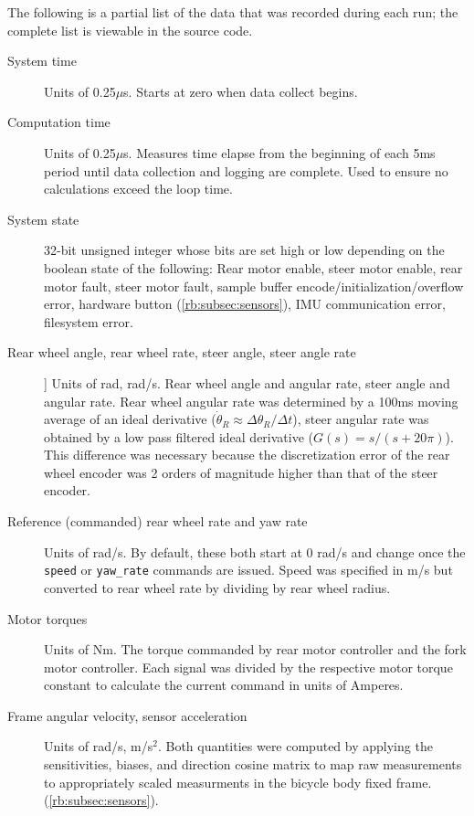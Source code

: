 The following is a partial list of the data that was recorded during each run;
the complete list is viewable in the source code.
\begin{description}
  \item[System time] Units of 0.25$\mu$s. Starts at zero when data collect
    begins.
  \item[Computation time] Units of 0.25$\mu$s. Measures time elapse from the
    beginning of each 5ms period until data collection and logging are
    complete. Used to ensure no calculations exceed the loop time.
  \item[System state] 32-bit unsigned integer whose bits are set high or low
    depending on the boolean state of the following: Rear motor enable, steer
    motor enable, rear motor fault, steer motor fault, sample buffer
    encode/initialization/overflow error, hardware button
    (\autoref{rb:subsec:sensors}), IMU communication error, filesystem error.
  \item[Rear wheel angle, rear wheel rate, steer angle, steer angle rate]]
    Units of rad, rad/s. Rear wheel angle and angular rate, steer angle and
    angular rate. Rear wheel angular rate was determined by a 100ms moving
    average of an ideal derivative ($\dot{\theta}_R \approx \Delta\theta_R /
    \Delta t$), steer angular rate was obtained by a low pass filtered ideal
    derivative ($G(s)=s/(s+20\pi)$).  This difference was necessary because the
    discretization error of the rear wheel encoder was 2 orders of magnitude
    higher than that of the steer encoder.
  \item[Reference (commanded) rear wheel rate and yaw rate] Units of rad/s. By
    default, these both start at 0 rad/s and change once the \verb|speed| or
    \verb|yaw_rate| commands are issued. Speed was specified in m/s but
    converted to rear wheel rate by dividing by rear wheel radius.
  \item[Motor torques] Units of Nm. The torque commanded by rear motor
    controller and the fork motor controller. Each signal was divided by the
    respective motor torque constant to calculate the current command in units
    of Amperes.
  \item[Frame angular velocity, sensor acceleration] Units of rad/s, m/s$^2$.
    Both quantities were computed by applying the sensitivities, biases, and
    direction cosine matrix to map raw measurements to appropriately scaled
    measurments in the bicycle body fixed frame.
    (\autoref{rb:subsec:sensors}).
\end{description}


